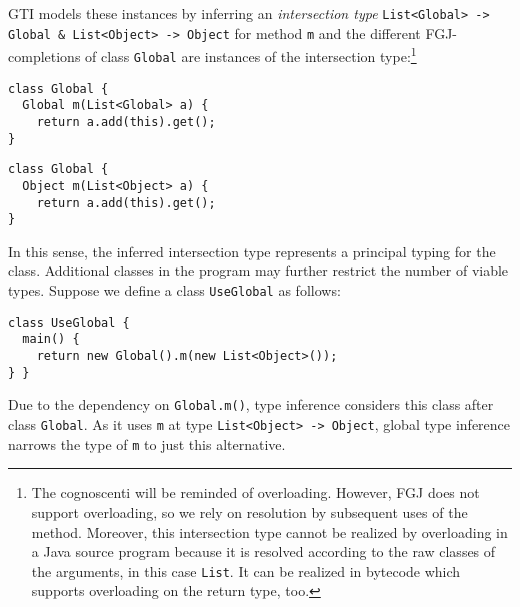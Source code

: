 GTI models these instances by inferring an \emph{intersection type}
\texttt{List<Global> -> Global \& List<Object> -> Object}
for method \texttt{m} and the different FGJ-completions of class \texttt{Global} are
instances of the intersection type:\footnote{The cognoscenti will be
  reminded of overloading. However, FGJ does not support overloading,
  so we rely on resolution by subsequent uses of the method. Moreover,
  this intersection type cannot be realized by overloading in a Java
  source program because it is resolved according to the raw classes
  of the arguments, in this case \lstinline{List}. It can be realized
  in bytecode which supports overloading on the return type, too.%
}
\begin{center}
  \begin{minipage}{0.49\linewidth}
\begin{lstlisting}[style=fgj]
class Global {
  Global m(List<Global> a) {
    return a.add(this).get();
}
\end{lstlisting}
  \end{minipage}
  \begin{minipage}{0.49\linewidth}
\begin{lstlisting}[style=fgj]
class Global {
  Object m(List<Object> a) {
    return a.add(this).get();
}
\end{lstlisting}
  \end{minipage}
\end{center}
In this sense, the inferred intersection type represents a principal
typing for the class.
Additional classes in the program may further restrict the number of
viable types. Suppose we define a class \texttt{UseGlobal} as
follows:
\begin{lstlisting}[style=tfgj]
class UseGlobal {
  main() {
    return new Global().m(new List<Object>());
} }
\end{lstlisting}
Due to the dependency on \texttt{Global.m()}, type inference considers this class after class
\texttt{Global}. As it uses \texttt{m} at type
\texttt{List<Object> -> Object}, global type inference narrows the
type of \texttt{m} to just this alternative.


